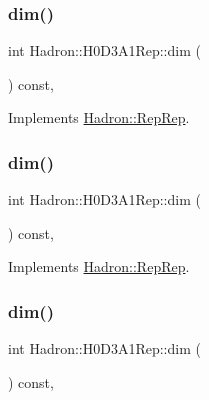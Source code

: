 \subsubsection{\texorpdfstring{dim()}{dim()}\hspace{0.1cm}{\footnotesize\ttfamily [3/5]}}
{\footnotesize\ttfamily int Hadron\+::\+H0\+D3\+A1\+Rep\+::dim (\begin{DoxyParamCaption}{ }\end{DoxyParamCaption}) const\hspace{0.3cm}{\ttfamily [inline]}, {\ttfamily [virtual]}}



Implements \mbox{\hyperlink{structHadron_1_1RepRep_a92c8802e5ed7afd7da43ccfd5b7cd92b}{Hadron\+::\+Rep\+Rep}}.

\mbox{\label{structHadron_1_1H0D3A1Rep_a783881d78557d5c845c79916a6367241}} 
\subsubsection{\texorpdfstring{dim()}{dim()}\hspace{0.1cm}{\footnotesize\ttfamily [4/5]}}
{\footnotesize\ttfamily int Hadron\+::\+H0\+D3\+A1\+Rep\+::dim (\begin{DoxyParamCaption}{ }\end{DoxyParamCaption}) const\hspace{0.3cm}{\ttfamily [inline]}, {\ttfamily [virtual]}}



Implements \mbox{\hyperlink{structHadron_1_1RepRep_a92c8802e5ed7afd7da43ccfd5b7cd92b}{Hadron\+::\+Rep\+Rep}}.

\mbox{\label{structHadron_1_1H0D3A1Rep_a783881d78557d5c845c79916a6367241}} 
\subsubsection{\texorpdfstring{dim()}{dim()}\hspace{0.1cm}{\footnotesize\ttfamily [5/5]}}
{\footnotesize\ttfamily int Hadron\+::\+H0\+D3\+A1\+Rep\+::dim (\begin{DoxyParamCaption}{ }\end{DoxyParamCaption}) const\hspace{0.3cm}{\ttfamily [inline]}, {\ttfamily [virtual]}}



